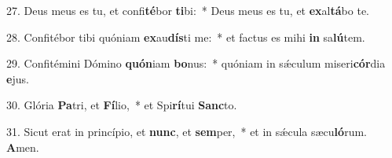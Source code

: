 27. Deus meus es tu, et confi\textbf{té}bor \textbf{ti}bi:~* Deus meus es tu, et \textbf{ex}al\textbf{tá}bo te.

28. Confitébor tibi quóniam \textbf{ex}au\textbf{dís}ti me:~* et factus es mihi \textbf{in} sa\textbf{lú}tem.

29. Confitémini Dómino \textbf{quón}iam \textbf{bo}nus:~* quóniam in s\'{\ae}culum miseri\textbf{cór}dia \textbf{e}jus.

30. Glória \textbf{Pa}tri, et \textbf{Fí}lio,~* et Spi\textbf{rí}tui \textbf{Sanc}to.

31. Sicut erat in princípio, et \textbf{nunc}, et \textbf{sem}per,~* et in s\'{\ae}cula sæcu\textbf{ló}rum. \textbf{A}men.